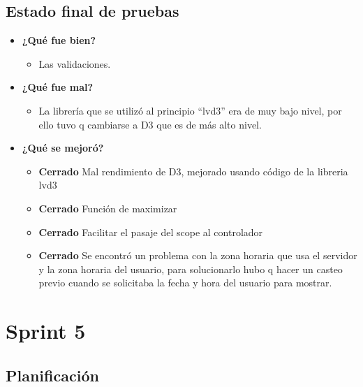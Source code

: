 \documentclass[a4paper,12pt]{article}
\begin{document}
\subsection{Estado final de pruebas}

	\begin{itemize}
		\item \textbf{¿Qué fue bien?}
        	\begin{itemize}
				\item        Las validaciones.
			\end{itemize}
            
		\item \textbf{¿Qué fue mal?}
        	\begin{itemize}
				\item        La librería que se utilizó al principio ``lvd3'' era de muy bajo nivel, por ello tuvo q cambiarse a D3 que es de más alto nivel. 
			\end{itemize}
            
   		\item \textbf{¿Qué se mejoró?}
        	\begin{itemize}
            	\item \textbf{Cerrado} Mal rendimiento de D3, mejorado usando código de la libreria lvd3
            	\item \textbf{Cerrado} Función de maximizar
                \item \textbf{Cerrado} Facilitar el pasaje del scope al controlador
                \item \textbf{Cerrado} Se encontró un problema con la zona horaria que usa el servidor y la zona horaria del usuario, para solucionarlo hubo q hacer un casteo previo cuando se solicitaba la fecha y hora del usuario para mostrar.
			\end{itemize}
       
	\end{itemize}


\section{Sprint 5}%
\subsection{Planificación}
\end{document}
